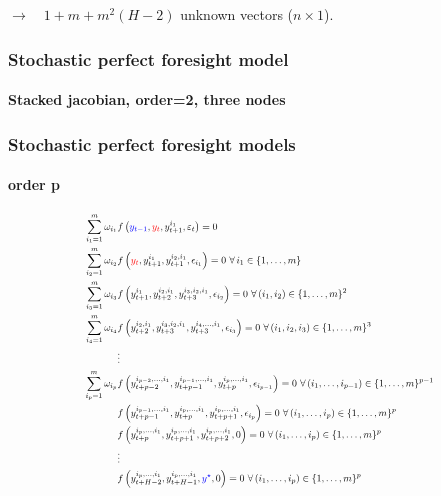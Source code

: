\documentclass{beamer}
\begin{document}
\begin{frame}[c,fragile]{}
\bigskip\bigskip

$\rightarrow\quad 1 + m + m^2(H-2)$ unknown vectors  ($n\times 1$).

\end{frame}


\begin{frame}
    \frametitle{Stochastic perfect foresight model}
    \framesubtitle{Stacked jacobian, order=2, three nodes}
  \begin{center}
    \scalebox{.5}{
  }
  \end{center}

\end{frame}


  \begin{frame}%
  \frametitle{Stochastic perfect foresight models}
  \framesubtitle{order p}


  \[
\scalebox{0.7}{$%
    \begin{split}
      \sum_{i_1=1}^m \omega_{i_1}&f\left({\color{blue}y_{t-1}}, {\color{red}y_t}, y_{t+1}^{i_1}, \varepsilon_t \right) = 0\\
      \sum_{i_2=1}^m \omega_{i_2}&f\left({\color{red}y_{t}}, y_{t+1}^{i_1}, y_{t+1}^{i_2,i_1}, \epsilon_{i_1} \right) = 0\,\, \forall\, i_1\in \{1,\dots,m\}\\
      \sum_{i_3=1}^m \omega_{i_3}&f\left(y_{t+1}^{i_1}, y_{t+2}^{i_2, i_1}, y_{t+3}^{i_3,i_2,i_1}, \epsilon_{i_2} \right) = 0\,\,  \forall\, (i_1,i_2)\in \{1,\dots,m\}^2\\
    \sum_{i_4=1}^m \omega_{i_4}&f\left(y_{t+2}^{i_2,i_1}, y_{t+3}^{i_3,i_2,i_1}, y_{t+3}^{i_4,\ldots,i_1}, \epsilon_{i_3} \right) = 0\,\,  \forall\, (i_1,i_2,i_3)\in \{1,\dots,m\}^3\\
      &\vdots \\
      \sum_{i_p=1}^m \omega_{i_p}&f\left(y_{t+p-2}^{i_{p-2},\ldots,i_1}, y_{t+p-1}^{i_{p-1},\ldots,i_1}, y_{t+p}^{i_p,\ldots,i_1}, \epsilon_{i_{p-1}} \right) = 0\,\,  \forall\, (i_1,\ldots,i_{p-1})\in \{1,\dots,m\}^{p-1}\\
                                 &f\left(y_{t+p-1}^{i_{p-1},\ldots,i_1}, y_{t+p}^{i_{p},\ldots,i_1}, y_{t+p+1}^{i_p,\ldots,i_1}, \epsilon_{i_{p}} \right) = 0\,\,  \forall\, (i_1,\ldots,i_{p})\in \{1,\dots,m\}^{p}\\
                                 &f\left(y_{t+p}^{i_{p},\ldots,i_1}, y_{t+p+1}^{i_{p},\ldots,i_1}, y_{t+p+2}^{i_p,\ldots,i_1}, 0 \right) = 0\,\,  \forall\, (i_1,\ldots,i_{p})\in \{1,\dots,m\}^{p}\\
                                 &\vdots \\
      &f\left(y_{t+H-2}^{i_{p},\ldots,i_1}, y_{t+H-1}^{i_{p},\ldots,i_1}, {\color{blue}y^{\star}}, 0 \right) = 0\,\,  \forall\, (i_1,\ldots,i_{p})\in \{1,\dots,m\}^{p}
    \end{split}$%
  }
  \]

  \end{frame}
\end{document}

